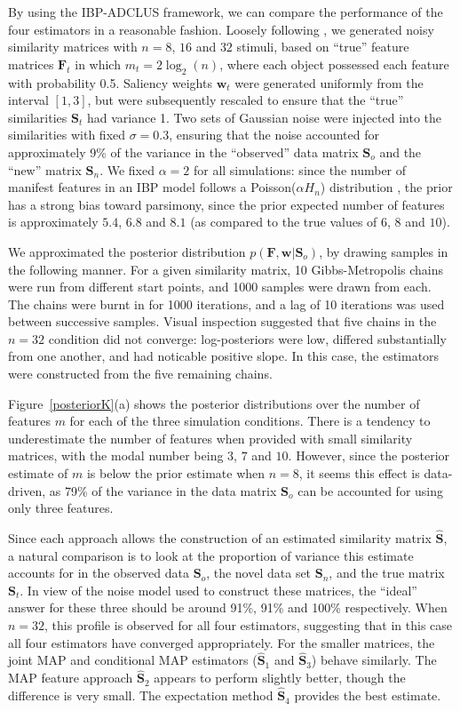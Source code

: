 \documentclass[11pt]{article}
\newcommand{\condon}{|}
\begin{document}
By using the IBP-ADCLUS framework, we can compare the performance of the four estimators in a reasonable fashion. Loosely following , we generated noisy similarity matrices with $n=8$, $16$ and $32$ stimuli, based on ``true''  feature matrices $\mathbf{F}_t$ in which $m_t=2\log_2(n)$, where each object possessed each feature with probability 0.5. Saliency weights $\mathbf{w}_t$ were generated uniformly from the interval $[1,3]$, but were subsequently rescaled to ensure that the ``true'' similarities $\mathbf{S}_t$ had variance 1. Two sets of Gaussian noise were injected into the similarities with fixed $\sigma=0.3$, ensuring that the noise accounted for approximately 9\% of the variance in the ``observed'' data matrix $\mathbf{S}_o$ and the ``new'' matrix $\mathbf{S}_n$. We fixed $\alpha=2$ for all simulations: since the number of manifest features in an IBP model follows a Poisson($\alpha H_n$) distribution \cite{griffithsg05}, the prior has a strong bias toward parsimony, since the prior expected number of features is approximately $5.4$, $6.8$ and $8.1$ (as compared to the true values of $6$, $8$ and $10$).

We approximated the posterior distribution $p(\mathbf{F},\mathbf{w}\condon \mathbf{S}_o)$, by drawing samples in the following manner. For a given similarity matrix, 10 Gibbs-Metropolis chains were run from different start points, and 1000 samples were drawn from each. The chains were burnt in for 1000 iterations, and a lag of 10 iterations was used  between successive samples. Visual inspection suggested that five chains in the $n=32$ condition did not converge: log-posteriors were low, differed substantially from one another, and had noticable positive slope. In this case, the estimators were constructed from the five remaining chains.

Figure~\ref{posteriorK}(a) shows the posterior distributions over the number of features $m$ for each of the three simulation conditions. There is a tendency to underestimate the number of features when provided with small similarity matrices, with the modal number being $3$, $7$ and $10$. However, since the posterior estimate of $m$ is below the prior estimate when $n=8$, it seems this effect is data-driven, as 79\% of the variance in the data matrix $\mathbf{S}_o$ can be accounted for using only three features.

Since each approach allows the construction of an estimated similarity matrix $\hat{\mathbf{S}}$, a natural comparison is to look at the proportion of variance this estimate accounts for in the observed data $\mathbf{S}_o$, the novel data set $\mathbf{S}_n$, and the true matrix $\mathbf{S}_t$. In view of the noise model used to construct these matrices, the ``ideal'' answer for these three should be around 91\%, 91\% and 100\% respectively. When $n=32$, this profile is observed for all four estimators, suggesting that in this case all four estimators have converged appropriately. For the smaller matrices, the joint MAP and conditional MAP estimators ($\hat{\mathbf{S}}_1$ and $\hat{\mathbf{S}}_3$) behave similarly. The MAP feature approach $\hat{\mathbf{S}}_2$ appears to perform slightly better, though the difference is very small. The expectation method $\hat{\mathbf{S}}_4$ provides the best estimate.
\end{document}
